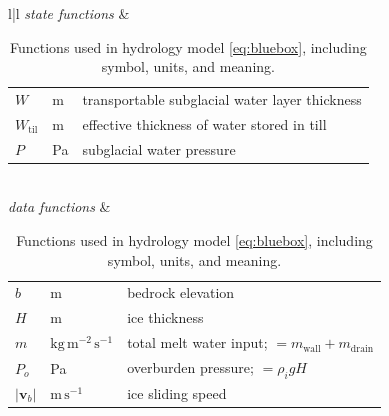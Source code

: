 \documentclass[11pt,final]{amsart}
\newcommand\bv{\mathbf{v}}
\newcommand{\Wtil}{W_{\text{til}}}
\begin{document}
\begin{table}[ht]
\caption{Functions used in hydrology model \eqref{eq:bluebox}, including symbol, units, and meaning.}
\begin{tabular}{l|l}
\hline
\emph{state functions} & \begin{tabular}{lll}
        $W$ & m \phantom{llllllllllll\,} & transportable subglacial water layer thickness \\
        $\Wtil$ & m & effective thickness of water stored in till \\
        $P$ & Pa & subglacial water pressure \\
        \end{tabular} \\ \hline
\emph{data functions} &  \begin{tabular}{lll}
        $b$ & m & bedrock elevation \\
        $H$ & m & ice thickness \\
        $m$ & $\text{kg}\,\text{m}^{-2}\,\text{s}^{-1}$ & total melt water input; $=m_{\text{wall}}+m_{\text{drain}}$ \\
        $P_o$ & Pa & overburden pressure; $= \rho_i g H$ \\
        $|\bv_b|$ & $\text{m}\,\text{s}^{-1}$ & ice sliding speed \\
        \end{tabular} \\ \hline
\end{tabular}
\label{tab:symbols}
\end{table}
\end{document}
